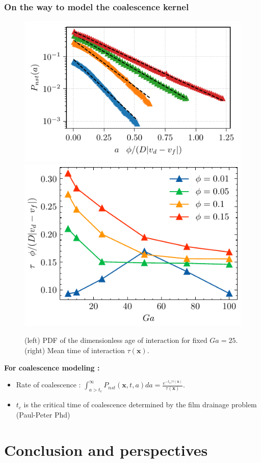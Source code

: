 \documentclass{sintefbeamer}
\begin{document}
\begin{frame}
  \frametitle{On the way to model the coalescence kernel}
    \begin{figure}
        \includegraphics[height=0.23\textwidth]{image/HOMOGENEOUS/fDrop/P_a_Ga_25.pdf}
        \includegraphics[height=0.23\textwidth]{image/HOMOGENEOUS/fPA/ageGa.pdf}
        \caption{ (left) PDF of the dimensionless age of interaction for fixed $Ga = 25$.
      (right) Mean time of interaction $\tau(\textbf{x})$.}
    \end{figure}
  \textbf{For coalescence modeling : }
\begin{itemize}
  \item Rate of coalescence : $\int_{a > t_c}^\infty P_{nst}(\textbf{x},t,a) da 
  = \frac{e^{-t_c/\tau(\textbf{x})}}{\tau(\textbf{x})}$. 
  \item $t_c$ is the critical time of coalescence determined by the film drainage problem (Paul-Peter Phd)
\end{itemize}

\end{frame}

\section{Conclusion and perspectives}
\section*{}
\end{document}
